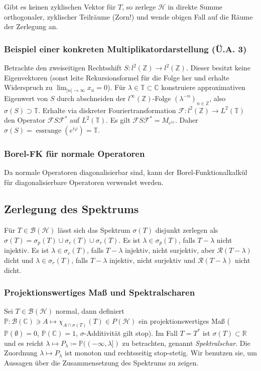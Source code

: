 \documentclass[11pt,a4paper]{scrartcl}
\newcommand{\Z}{\mathbb{Z}} %
\newcommand{\R}{\mathbb{R}} %
\newcommand{\C}{\mathbb{C}} %
\newcommand{\Hc}{\mathcal{H}}
\newcommand{\B}{\mathcal{B}}
\newcommand{\F}{\mathcal{F}}
\newcommand{\Rc}{\mathcal{R}}
\theoremstyle{plain}
\theoremstyle{definition}
\theoremstyle{remark}
\DeclareMathOperator{\essrange}{ess range}
\begin{document}
Gibt es keinen zyklischen Vektor für $T$, so zerlege $\Hc$ in direkte Summe orthogonaler, zyklischer Teilräume (Zorn!) und wende obigen Fall auf die Räume der Zerlegung an.

\subsubsection{Beispiel einer konkreten Multiplikatordarstellung (Ü.A. 3)}

Betrachte den zweiseitigen Rechtsshift $S: l^2(\Z) \to l^2(\Z)$. Dieser besitzt keine Eigenvektoren (sonst leite Rekursionsformel für die Folge her und erhalte Widerspruch zu $\lim_{|n|\to \infty} x_n = 0$). Für $\lambda \in \mathbb{T} \subset \C$ konstruiere approximativen Eigenwert von $S$ durch abschneiden der $l^\infty(\Z)$-Folge $(\lambda^{-n})_{n\in \Z}$, also $\sigma(S) \supset \mathbb{T}$. Erhalte via diskreter Fouriertransformation $\F: l^2(\Z) \to L^2(\mathbb T)$ den Operator $\F S\F^*$ auf $L^2(\mathbb T)$. Es gilt $\F S\F^*=M_{e^{i\varphi}}$. Daher $\sigma(S)=\essrange(e^{i\varphi})=\mathbb{T}$.

\subsubsection{Borel-FK für normale Operatoren}

Da normale Operatoren diagonalisierbar sind, kann der Borel-Funktionalkalkül für diagonalisierbare Operatoren verwendet werden.

\subsection{Zerlegung des Spektrums}

Für $T\in \B(\Hc)$ lässt sich das Spektrum $\sigma(T)$ disjunkt zerlegen als $\sigma(T)=\sigma_p(T) \cup \sigma_c(T) \cup \sigma_r(T)$. Es ist $\lambda \in \sigma_p(T)$, falls $T-\lambda$ nicht injektiv. Es ist $\lambda \in \sigma_c(T)$, falls $T-\lambda$ injektiv, nicht surjektiv, aber $\Rc(T-\lambda)$ dicht und $\lambda \in \sigma_r(T)$, falls $T-\lambda$ injektiv, nicht surjektiv und $\Rc(T-\lambda)$ nicht dicht.

\subsubsection{Projektionswertiges Maß und Spektralscharen}

Sei $T\in \B(\Hc)$ normal, dann definiert $\mathbb{P}: \B(\C) \ni A \mapsto \chi_{A\cap \sigma(T)}(T) \in P(\Hc)$ ein projektionswertiges Maß ($\mathbb{P}(\emptyset) = 0$, $\mathbb{P}(\C) = 1$, $\sigma$-Additivität gilt stop). Im Fall $T=T^*$ ist $\sigma(T)\subset \R$ und es reicht $\lambda \mapsto P_\lambda \coloneqq \mathbb{P}((-\infty, \lambda])$ zu betrachten, genannt \emph{Spektralschar}. Die Zuordnung $\lambda \mapsto P_\lambda$ ist monoton und rechtsseitig stop-stetig. Wir benutzen sie, um Aussagen über die Zusammensetzung des Spektrums zu zeigen.
\end{document}
